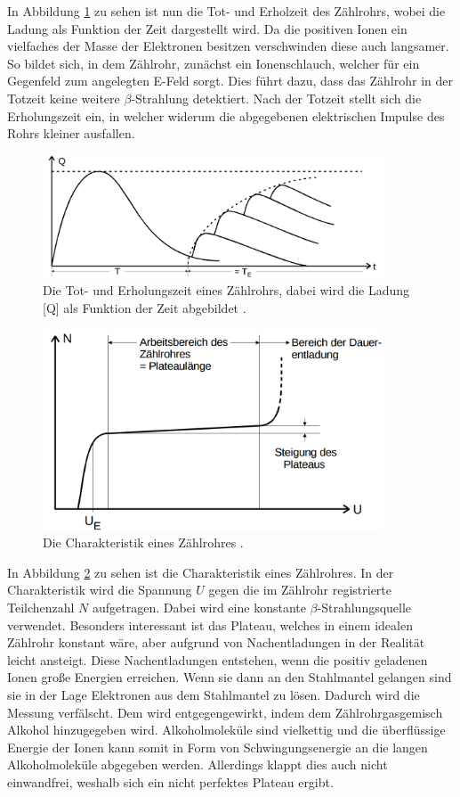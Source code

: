 \documentclass[
  bibliography=totoc,     %
  captions=tableheading,  %
  titlepage=firstiscover, %
]{scrartcl}
\begin{document}
In Abbildung \ref{fig:V7033} zu sehen ist nun die Tot- und Erholzeit des
Zählrohrs, wobei die Ladung als Funktion der Zeit dargestellt wird.
Da die positiven Ionen ein vielfaches der Masse der Elektronen besitzen
verschwinden diese auch langsamer. So bildet sich, in dem Zählrohr, zunächst ein
Ionenschlauch, welcher für ein Gegenfeld zum angelegten E-Feld sorgt. Dies führt dazu, dass das
Zählrohr in der Totzeit keine weitere $\beta$-Strahlung detektiert.
Nach der Totzeit stellt sich die Erholungszeit ein, in welcher widerum die
abgegebenen elektrischen Impulse des Rohrs kleiner ausfallen.
\clearpage
\begin{figure}[htb]
  \centering
  \includegraphics[width=0.9\textwidth]{V7033.png}
  \caption{Die Tot- und Erholungszeit eines Zählrohrs, dabei wird die Ladung [Q]
  als Funktion der Zeit abgebildet \cite{anleitung}.}
  \label{fig:V7033}
\end{figure}
\begin{figure}[htb]
  \centering
  \includegraphics[width=0.9\textwidth]{V7034.png}
  \caption{Die Charakteristik eines Zählrohres \cite{anleitung}.}
  \label{fig:V7034}
\end{figure}

In Abbildung \ref{fig:V7034} zu sehen ist die Charakteristik eines Zählrohres.
In der Charakteristik wird die Spannung $U$ gegen die im Zählrohr registrierte
Teilchenzahl $N$ aufgetragen. Dabei wird eine konstante $\beta$-Strahlungsquelle verwendet.
Besonders interessant ist das Plateau, welches in einem idealen Zählrohr
konstant wäre, aber aufgrund von Nachentladungen in der Realität leicht ansteigt.
Diese Nachentladungen entstehen, wenn die positiv geladenen Ionen große Energien
erreichen. Wenn sie dann an den Stahlmantel gelangen sind sie in der Lage
Elektronen aus dem Stahlmantel zu lösen. Dadurch wird die Messung verfälscht.
Dem wird entgegengewirkt, indem dem Zählrohrgasgemisch Alkohol hinzugegeben wird.
Alkoholmoleküle sind vielkettig und die überflüssige Energie der Ionen kann
somit in Form von Schwingungsenergie an die langen Alkoholmoleküle abgegeben werden.
Allerdings klappt dies auch nicht einwandfrei, weshalb sich ein nicht perfektes
Plateau ergibt.
\end{document}
